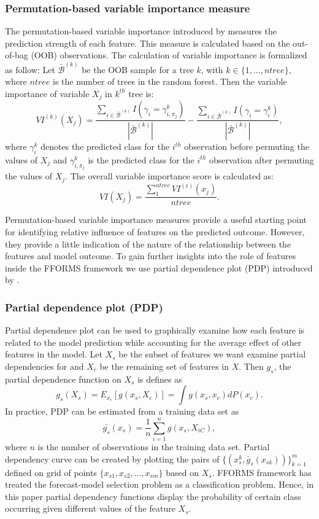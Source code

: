 \documentclass[11pt,a4paper,]{article}
\begin{document}
\subsubsection{Permutation-based variable importance
measure}\label{permutation-based-variable-importance-measure}

The permutation-based variable importance introduced by
\textcite{breiman2001random} measures the prediction strength of each
feature. This measure is calculated based on the out-of-bag (OOB)
observations. The calculation of variable importance is formalized as
follow: Let \(\bar{\mathcal{B}}^{(k)}\) be the OOB sample for a tree
\(k\), with \(k\in \{1,...,ntree\}\), where \(ntree\) is the number of
trees in the random forest. Then the variable importance of variable
\(X_{j}\) in \(k^{th}\) tree is:
\[VI^{(k)}(X_{j})=\frac{\sum_{i\in \bar{\mathcal{B}}^{(k)}}I(\gamma_{i}=\gamma_{i,\pi_{j}}^{k})}{|\bar{\mathcal{B}}^{(k)}|}-\frac{\sum_{i\in \bar{\mathcal{B}}^{(k)}}I(\gamma_{i}=\gamma_{i}^{k})}{|\bar{\mathcal{B}}^{(k)}|},\]
where \(\gamma_{i}^{k}\) denotes the predicted class for the \(i^{th}\)
observation before permuting the values of \(X_{j}\) and
\(\gamma_{i, \pi_{j}}^{k}\) is the predicted class for the \(i^{th}\)
observation after permuting the values of \(X_{j}\). The overall
variable importance score is calculated as:
\[VI(X_{j})=\frac{\sum_{1}^{ntree}VI^{(t)}(x_{j})}{ntree}.\]

Permutation-based variable importance measures provide a useful starting
point for identifying relative influence of features on the predicted
outcome. However, they provide a little indication of the nature of the
relationship between the features and model outcome. To gain further
insights into the role of features inside the FFORMS framework we use
partial dependence plot (PDP) introduced by
\textcite{friedman2008predictive}.

\subsubsection{Partial dependence plot
(PDP)}\label{partial-dependence-plot-pdp}

Partial dependence plot can be used to graphically examine how each
feature is related to the model prediction while accounting for the
average effect of other features in the model. Let \(X_s\) be the subset
of features we want examine partial dependencies for and \(X_c\) be the
remaining set of features in \(X\). Then \(g_s\), the partial dependence
function on \(X_s\) is defines as
\[g_s(X_s)=E_{x_c}[g(x_s, X_c)]=\int{g(x_s, x_c)dP(x_c).}\] In practice,
PDP can be estimated from a training data set as
\[\bar{g_s}(x_s)=\frac{1}{n}\sum_{i=1}^{n}g(x_s, X_{iC}),\] where \(n\)
is the number of observations in the training data set. Partial
dependency curve can be created by plotting the pairs of
\(\{(x_s^k, \bar{g}_s(x_{sk}))\}_{k=1}^{m}\) defined on grid of points
\(\{x_{s1}, x_{s2},\dots, x_{sm}\}\) based on \(X_s\). FFORMS framework
has treated the forecast-model selection problem as a classification
problem. Hence, in this paper partial dependency functions display the
probability of certain class occurring given different values of the
feature \(X_s\).
\end{document}
